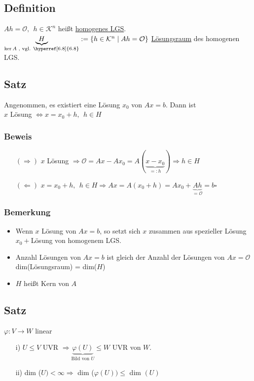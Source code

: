 \documentclass[12pt,titlepage, pdf]{article}
\newcommand{\K}{\mathcal{K}}
\newcommand{\uline}[1]{\underline{#1}}
\newcommand{\qed}{\hfill$\square$}
\renewcommand{\>}{\rightarrow}
\renewcommand{\*}{\cdot}
\renewcommand{\O}{\mathcal{O}}
\renewcommand{\phi}{\varphi}
\begin{document}
\subsection{Definition}
$A h = \O, ~~h \in \K^n$ heißt \uline{homogenes LGS}.\\
 $\underbrace{H}_{\ker A\textrm{ , vgl. \hyperref[6.8]{6.8}}} := \{h \in \K^n \mid Ah = \O \}$ \uline{Lösungsraum} des homogenen LGS.
 \subsection{Satz}
 Angenommen, es existiert eine Lösung $x_0$ von $Ax = b$. Dann ist\\ $x$ Lösung $\Leftrightarrow x = x_0 +h,~~ h \in H$ 
 \subsubsection*{Beweis}
 \begin{itemize}
 	\item[$(\Rightarrow)$] $x$ Lösung $\Rightarrow\O = Ax -Ax_0 = A(\underbrace{x-x_0}_{=:h}) \Rightarrow h \in H$
 	\item[$(\Leftarrow)$] $x= x_0 + h,~~h \in H \Rightarrow Ax = A(x_0 + h) = Ax_0 + \underbrace{Ah}_{=\O} = b$\qed
 \end{itemize}
\subsubsection*{Bemerkung}
\begin{itemize}
	\item Wenn $x$ Lösung von $Ax = b$, so setzt sich $x$ zusammen aus spezieller Lösung $x_0 + $Lösung von homogenem LGS.
	\item Anzahl Lösungen von $Ax = b$ ist gleich der Anzahl der Lösungen von $Ax = \O$\\
	dim(Lösungsraum) = dim($H$)
	\item $H$ heißt Kern von $A$
\end{itemize}
\subsection{Satz}
\label{6.7}
$\phi: V \rightarrow W$ linear
\begin{itemize}
	\item[i)] $U \leq V$ UVR $\Rightarrow \underbrace{\phi(U)}_{\text{Bild von }U} \leq W $ UVR von $W$.
	\item[ii)]
	dim ($U) < \infty \Rightarrow$ dim ($\phi(U)) \leq$ dim $(U)$
\end{itemize}
\end{document}

